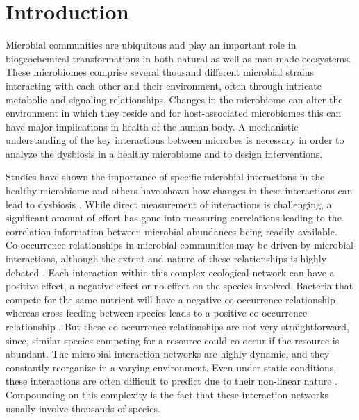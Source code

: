 
\section*{Introduction}

  Microbial communities are ubiquitous and play an important role in biogeochemical transformations in both natural as well as man-made ecosystems.
  These microbiomes comprise several thousand different microbial strains interacting with each other and their environment, often through intricate metabolic and signaling relationships.
  Changes in the microbiome can alter the environment in which they reside \cite{HumanMicrobiomeProjectConsortium2012,Lloyd-Price2016} and for host-associated microbiomes this can have major implications in health of the human body.
  A mechanistic understanding of the key interactions between microbes is necessary in order to analyze the dysbiosis in a healthy microbiome and to design interventions.

  Studies have shown the importance of specific microbial interactions in the healthy microbiome \cite{Lloyd-Price2016} and others have shown how changes in these interactions can lead to dysbiosis \cite{Wang2017,Gilbert2016,Belizario2015}.
  While direct measurement of interactions is challenging, a significant amount of effort has gone into measuring correlations leading to the correlation information between microbial abundances being readily available.
  Co-occurrence relationships in microbial communities may be driven by microbial interactions, although the extent and nature of these relationships is highly debated \cite{Zuniga2017}.
  Each interaction within this complex ecological network can have a positive effect, a negative effect or no effect on the species involved.
  Bacteria that compete for the same nutrient will have a negative co-occurrence relationship \cite{Ghoul2016} whereas cross-feeding between species leads to a positive co-occurrence relationship \cite{DSouza2018}.
  But these co-occurrence relationships are not very straightforward, since, similar species competing for a resource could co-occur if the resource is abundant.
  The microbial interaction networks are highly dynamic, and they constantly reorganize in a varying environment.
  Even under static conditions, these interactions are often difficult to predict due to their non-linear nature \cite{Konopka2015}.
  Compounding on this complexity is the fact that these interaction networks usually involve thousands of species.


